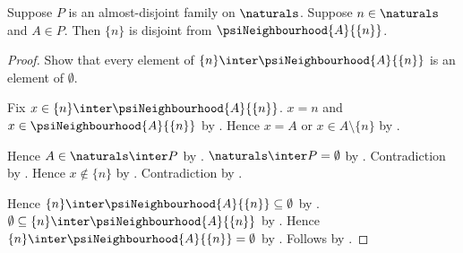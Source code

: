 \begin{proposition}\label{psi_natural_family_neighbourhoods_disjoint}
    Suppose $P$ is an almost-disjoint family on $\naturals$.
    Suppose $n\in\naturals$ and $A\in P$.
    Then $\{n\}$ is disjoint from $\psiNeighbourhood{A}{\{n\}}$.
\end{proposition}
\begin{proof}
    Show that every element of
        $\{n\}\inter\psiNeighbourhood{A}{\{n\}}$ is an element of
        $\emptyset$.
    \begin{subproof}
        Fix $x\in\{n\}\inter\psiNeighbourhood{A}{\{n\}}$.
        $x=n$ and $x\in\psiNeighbourhood{A}{\{n\}}$
            by .
        Hence $x=A$ or $x\in A\setminus\{n\}$
            by .
        \begin{byCase}
                Hence $A\in\naturals\inter P$ by .
                $\naturals\inter P=\emptyset$
                    by .
                Contradiction by .
                Hence $x\notin\{n\}$ by .
                Contradiction by .
        \end{byCase}
    \end{subproof}
    Hence $\{n\}\inter\psiNeighbourhood{A}{\{n\}}\subseteq\emptyset$
        by .
    $\emptyset\subseteq
        \{n\}\inter\psiNeighbourhood{A}{\{n\}}$
        by .
    Hence $\{n\}\inter\psiNeighbourhood{A}{\{n\}}=\emptyset$
        by .
    Follows by .
\end{proof}

